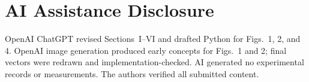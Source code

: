 \documentclass[journal]{IEEEtran}
\begin{document}
\section*{AI Assistance Disclosure}
OpenAI ChatGPT revised Sections~I--VI and drafted Python for Figs.~1, 2, and
4. OpenAI image generation produced early concepts for Figs.~1 and 2; final
vectors were redrawn and implementation-checked. AI generated no experimental
records or measurements. The authors verified all submitted content.



\end{document}
